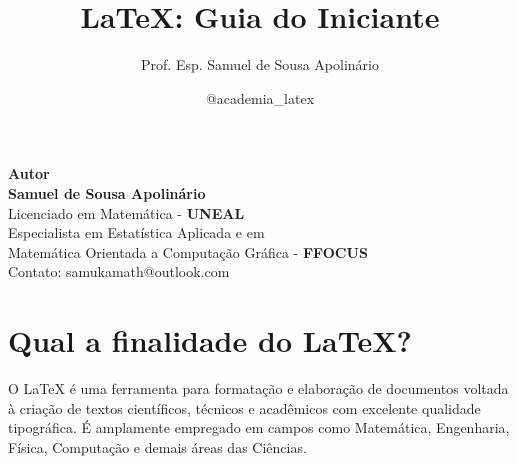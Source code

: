 \documentclass[12pt,a4paper]{article}
\title{\LaTeX: Guia do Iniciante}
\author{Prof. Esp. Samuel de Sousa Apolinário}
\date{@academia\_latex}
\makeatletter
\newcommand{\paginaautor}{
	\newpage
	\thispagestyle{empty}
	\begin{flushright}
		
		{\Large \textbf{Autor}}\\[1cm]
		\textbf{Samuel de Sousa Apolinário}\\[0.3cm]
		Licenciado em Matemática - \textbf{UNEAL}\\
		Especialista em Estatística Aplicada e em \\ Matemática Orientada a Computação Gráfica - \textbf{FFOCUS}\\[0.5cm]
		Contato: samukamath@outlook.com
	\end{flushright}
	\newpage
}
\makeatother
\begin{document}
	
	\maketitle
	\thispagestyle{empty}
	
	\newpage

    
	
	\thispagestyle{empty}
	
	\newpage
	
	\paginaautor
	
	\thispagestyle{empty}
	\tableofcontents
	\thispagestyle{empty}
	
	\newpage
	
	
	\thispagestyle{empty}
	
	\newpage
	
	\section{Qual a finalidade do LaTeX?}
	O LaTeX é uma ferramenta para formatação e elaboração de documentos voltada à criação de textos científicos, técnicos e acadêmicos com excelente qualidade tipográfica. É amplamente empregado em campos como Matemática, Engenharia, Física, Computação e demais áreas das Ciências.
	
\end{document}
